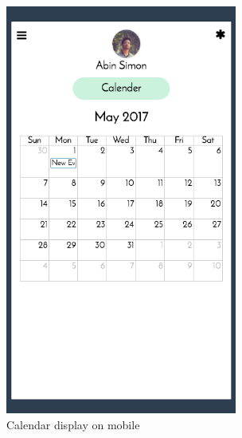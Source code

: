 \begin{figure}[htb]
    \centering
    \includegraphics[width=3in]{mobilecalendar.png}
    \caption{Calendar display on mobile}
    \label{fig:mobilecalendar} %
\end{figure}
